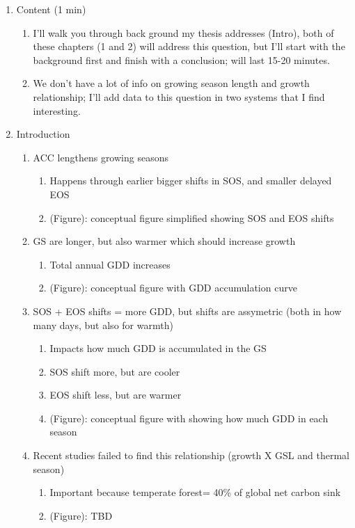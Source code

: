\documentclass{article}\usepackage[]{graphicx}\usepackage[]{xcolor}
\begin{document}
\begin{enumerate}

\item Content (1 min)
  \begin{enumerate}
  \item I'll walk you through back ground my thesis addresses (Intro), both of these chapters (1 and 2) will address this question, but I'll start with the background first and finish with a conclusion; will last 15-20 minutes.
  \item We don't have a lot of info on growing season length and growth relationship; I'll add data to this question in two systems that I find interesting.
  \end{enumerate}
  
\item Introduction
  \begin{enumerate}
  \item ACC lengthens growing seasons
    \begin{enumerate}
    \item Happens through earlier bigger shifts in SOS, and smaller delayed EOS
    \item (Figure): conceptual figure simplified showing SOS and EOS shifts
    \end{enumerate}
    
  \item GS are longer, but also warmer which should increase growth
    \begin{enumerate}
    \item Total annual GDD increases
    \item (Figure): conceptual figure with GDD accumulation curve 
    \end{enumerate}
  
  \item SOS + EOS shifts = more GDD, but shifts are assymetric (both in how many days, but also for warmth)
    \begin{enumerate}
    \item Impacts how much GDD is accumulated in the GS
    \item SOS shift more, but are cooler
    \item EOS shift less, but are warmer
    \item (Figure): conceptual figure with showing how much GDD in each season
    \end{enumerate}
    
  \item Recent studies failed to find this relationship (growth X GSL and thermal season)
    \begin{enumerate}
    \item Important because temperate forest= 40\% of global net carbon sink
    \item (Figure): TBD
    \end{enumerate}
    

\end{enumerate}
\end{enumerate}
\end{document}
